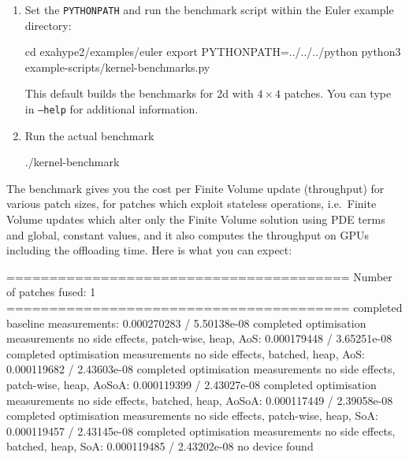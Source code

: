 \begin{framed}
\begin{enumerate}
  \begin{bash}
make
  \end{bash}
  \item Set the \texttt{PYTHONPATH} and run the benchmark script within the
  Euler example directory:
  \begin{bash}
  cd exahype2/examples/euler
  export PYTHONPATH=../../../python
  python3 example-scripts/kernel-benchmarks.py
  \end{bash}
  This default builds the benchmarks for 2d with $4 \times 4$ patches. You can
  type in \texttt{--help} for additional information.
  \item Run the actual benchmark
  \begin{bash}
./kernel-benchmark
  \end{bash}
\end{enumerate}

\noindent
The benchmark gives you the cost per Finite Volume update (throughput) for
various patch sizes, for patches which exploit stateless operations, i.e.~Finite
Volume updates which alter only the Finite Volume solution using PDE terms and
global, constant values, and it also computes the throughput on GPUs including
the offloading time.
Here is what you can expect:

\begin{terminalOutput}
========================================
  Number of patches fused: 1
========================================
completed baseline measurements: 0.000270283 / 5.50138e-08
completed optimisation measurements no side effects, patch-wise, heap, AoS: 0.000179448 / 3.65251e-08
completed optimisation measurements no side effects, batched, heap, AoS: 0.000119682 / 2.43603e-08
completed optimisation measurements no side effects, patch-wise, heap, AoSoA: 0.000119399 / 2.43027e-08
completed optimisation measurements no side effects, batched, heap, AoSoA: 0.000117449 / 2.39058e-08
completed optimisation measurements no side effects, patch-wise, heap, SoA: 0.000119457 / 2.43145e-08
completed optimisation measurements no side effects, batched, heap, SoA: 0.000119485 / 2.43202e-08
no device found
\end{terminalOutput}


\end{framed}
